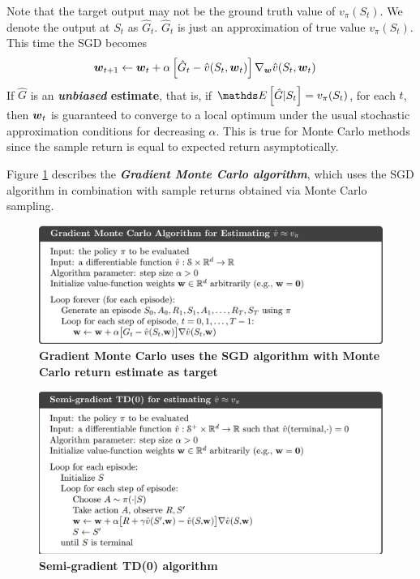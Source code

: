 \documentclass[11pt]{article}
\begin{document}
Note that the target output may not be the ground truth value of $v_{\pi}(S_{t})$. We denote the output at $S_{t}$ as $\hat{G}_{t}$. $\hat{G}_{t}$ is just an approximation of true value $v_{\pi}(S_{t})$. This time the SGD becomes
\begin{align}
\boldsymbol{w}_{t+1} &\leftarrow  \boldsymbol{w}_{t} + \alpha \left[\hat{G}_{t} - \hat{v}(S_{t}, \boldsymbol{w}_{t})\right] \nabla_{\boldsymbol{w}}{\hat{v}(S_{t}, \boldsymbol{w}_{t})} \label{eqn: sgd_fun_approx}
\end{align} If $\hat{G}$ is an \textbf{\emph{unbiased} estimate}, that is, if $\E{}{\hat{G}| S_{t}} = v_{\pi}(S_{t})$, for each $t$, then $\boldsymbol{w}_t$ is guaranteed to converge to a local optimum under the usual stochastic approximation conditions for decreasing $\alpha$. This is true for Monte Carlo methods since the sample return is equal to expected return asymptotically.

Figure \ref{fig: gradient_monte_carlo} describes the \emph{\textbf{Gradient Monte Carlo algorithm}}, which uses the SGD algorithm in combination with sample returns obtained via Monte Carlo sampling. 

\begin{figure}
\begin{minipage}[t]{1\linewidth}
  \centering
  \centerline{\includegraphics[scale = 0.3]{gradient_monte_carlo.png}}
\end{minipage}
\caption{\footnotesize{\textbf{Gradient Monte Carlo uses the SGD algorithm with Monte Carlo return estimate as target}}}
\label{fig: gradient_monte_carlo}
\end{figure}

\begin{figure}
\begin{minipage}[t]{1\linewidth}
  \centering
  \centerline{\includegraphics[scale = 0.3]{semi_grad_td_algo.png}}
\end{minipage}
\caption{\footnotesize{\textbf{Semi-gradient TD(0) algorithm}}}
\label{fig: semi_grad_td_algo}
\end{figure}
\end{document}
